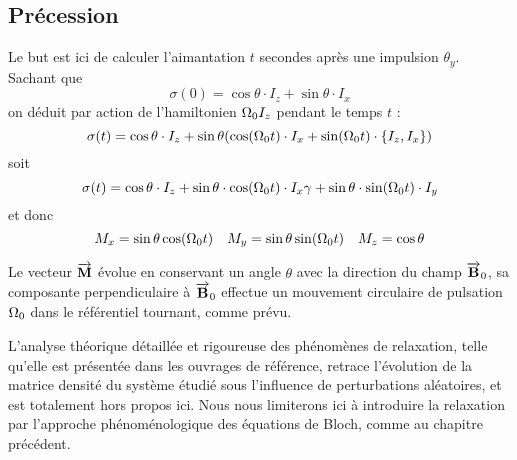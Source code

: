 \subsection{Précession}
Le but est ici de calculer l'aimantation $t$ secondes après une impulsion $\theta_y$.
Sachant que
\begin{equation}
\sigma(0) = \cos\theta \cdot I_z + \sin\theta \cdot I_x
\end{equation}
on déduit par action de l'hamiltonien $\Omega_0 I_z$ pendant le temps $t$ :
\begin{equation}
\sigma(t) = \cos\theta \cdot I_z + \sin\theta 
(\cos(\Omega_0 t) \cdot I_x + \sin(\Omega_0 t) \cdot \{I_z,I_x\}) 
\end{equation}
soit
\begin{equation}
\sigma(t) = \cos\theta \cdot I_z + \sin\theta \cdot \cos(\Omega_0 t) \cdot I_x\gamma
+ \sin\theta \cdot \sin(\Omega_0 t) \cdot I_y
\end{equation}
et donc
\begin{equation}
M_x = \sin\theta\cos(\Omega_0 t) \quad 
M_y = \sin\theta\sin(\Omega_0 t) \quad 
M_z = \cos\theta
\end{equation}

Le vecteur $\overrightarrow{\mathbf{M}}$ évolue en conservant un angle $\theta$ avec la direction du champ $\overrightarrow{\mathbf{B}}_0$,
sa composante perpendiculaire à $\overrightarrow{\mathbf{B}}_0$ effectue un mouvement circulaire de pulsation $\Omega_0$
dans le référentiel tournant, comme prévu.

L'analyse théorique détaillée et rigoureuse des phénomènes de relaxation,
telle qu'elle est présentée dans les ouvrages de référence,
retrace l'évolution de la matrice densité du système étudié sous l'influence
de perturbations aléatoires, et est totalement hors propos ici.
Nous nous limiterons ici à introduire la relaxation par l'approche phénoménologique
des équations de Bloch, comme au chapitre précédent.

